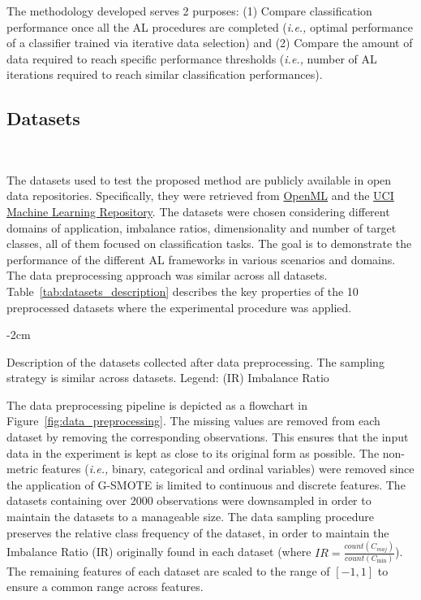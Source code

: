 \documentclass[parskip=full]{scrartcl}
\begin{document}
The methodology developed serves 2 purposes: (1) Compare classification
performance once all the AL procedures are completed (\textit{i.e.,} optimal
performance of a classifier trained via iterative data selection) and (2)
Compare the amount of data required to reach specific performance thresholds
(\textit{i.e.,} number of AL iterations required to reach similar
classification performances).

\subsection{Datasets}~\label{sec:datasets}

The datasets used to test the proposed method are publicly available in open
data repositories. Specifically, they were retrieved from
\href{https://www.openml.org/}{OpenML} and the
\href{https://archive.ics.uci.edu/}{UCI Machine Learning Repository}. The
datasets were chosen considering different domains of application, imbalance
ratios, dimensionality and number of target classes, all of them focused on
classification tasks. The goal is to demonstrate the performance of the
different AL frameworks in various scenarios and domains. The data
preprocessing approach was similar across all datasets.
Table~\ref{tab:datasets_description} describes the key properties of the 10
preprocessed datasets where the experimental procedure was applied. 

\begin{table}[H]
    \centering
    \addtolength{\leftskip} {-2cm}
    \addtolength{\rightskip}{-2cm}
    \caption{\label{tab:datasets_description}
        Description of the datasets collected after data preprocessing. The
        sampling strategy is similar across datasets. Legend: (IR) Imbalance
        Ratio
    }
\end{table}

The data preprocessing pipeline is depicted as a flowchart in
Figure~\ref{fig:data_preprocessing}. The missing values are removed from each
dataset by removing the corresponding observations. This ensures that the
input data in the experiment is kept as close to its original form as
possible. The non-metric features (\textit{i.e.,} binary, categorical and
ordinal variables) were removed since the application of G-SMOTE is limited to
continuous and discrete features. The datasets containing over 2000
observations were downsampled in order to maintain the datasets to a
manageable size. The data sampling procedure preserves the relative class
frequency of the dataset, in order to maintain the Imbalance Ratio (IR)
originally found in each dataset (where $IR =
\frac{count(C_{maj})}{count(C_{\min})}$). The remaining features of each
dataset are scaled to the range of $[-1, 1]$ to ensure a common range across
features.
\end{document}
